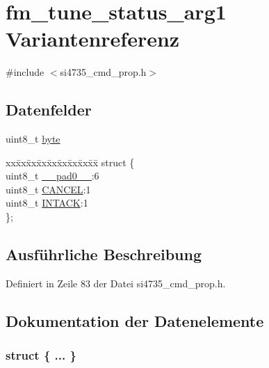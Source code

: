 \hypertarget{unionfm__tune__status__arg1}{}\section{fm\+\_\+tune\+\_\+status\+\_\+arg1 Variantenreferenz}
\label{unionfm__tune__status__arg1}


{\ttfamily \#include $<$si4735\+\_\+cmd\+\_\+prop.\+h$>$}

\subsection*{Datenfelder}
\begin{DoxyCompactItemize}
\item 
uint8\+\_\+t \hyperlink{unionfm__tune__status__arg1_a96f44d20f1dbf1c8785a7bc99a46164c}{byte}
\item 
\begin{tabbing}
xx\=xx\=xx\=xx\=xx\=xx\=xx\=xx\=xx\=\kill
struct \{\\
\>uint8\_t \hyperlink{unionfm__tune__status__arg1_a8b4eebe79ded0459acec2f4950102ba3}{\_\_pad0\_\_}:6\\
\>uint8\_t \hyperlink{unionfm__tune__status__arg1_ac030f6cac29ec43cc0457a01f7ea9f93}{CANCEL}:1\\
\>uint8\_t \hyperlink{unionfm__tune__status__arg1_adf4f80d8fb205d6c93c6423d84d63d9c}{INTACK}:1\\
\}; \\

\end{tabbing}\end{DoxyCompactItemize}


\subsection{Ausführliche Beschreibung}


Definiert in Zeile 83 der Datei si4735\+\_\+cmd\+\_\+prop.\+h.



\subsection{Dokumentation der Datenelemente}
\hypertarget{unionfm__tune__status__arg1_aec5f798da0d9c47b45d9e2d54b6af616}{}\subsubsection[{"@9}]{\setlength{\rightskip}{0pt plus 5cm}struct \{ ... \} }\label{unionfm__tune__status__arg1_aec5f798da0d9c47b45d9e2d54b6af616}
\hypertarget{unionfm__tune__status__arg1_a8b4eebe79ded0459acec2f4950102ba3}{}
